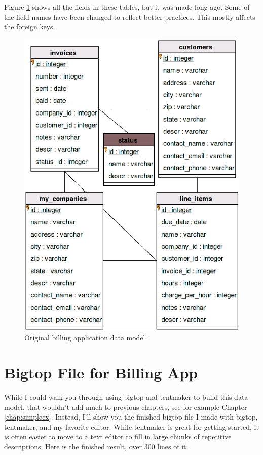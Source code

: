 Figure \ref{fig:billing_model} shows all the fields in these tables, but
it was made long ago.  Some of the field names have been changed to
reflect better practices.  This mostly affects the foreign keys.

\begin{figure}
\includegraphics[height=6in]{billing_model}
\caption{Original billing application data model.}
\label{fig:billing_model}
\end{figure}

\section{Bigtop File for Billing App}

While I could walk you through using bigtop and tentmaker to build this
data model, that wouldn't add much to previous chapters, see for example
Chapter \ref{chap:simpleex}.  Instead, I'll show you the finished bigtop
file I made with bigtop, tentmaker, and my favorite editor.  While tentmaker
is great for getting started, it is often easier to move to a text editor to
fill in large chunks of repetitive descriptions.  Here is the finished result,
over 300 lines of it:


